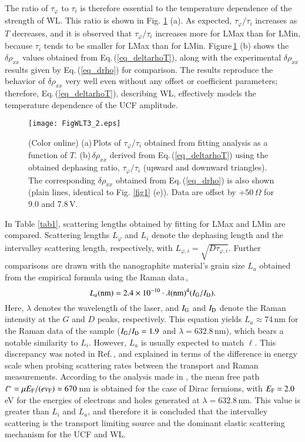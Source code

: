 \documentclass[final,5p,times,twocolumn]{elsarticle}
\begin{document}
The ratio of $\tau_\varphi$ to $\tau_i$ is therefore essential to the temperature dependence of the strength of WL. 
This ratio is shown in Fig. \ref{figWLT3} (a). 
As expected, $\tau_\varphi/\tau_i$ increases as $T$ decreases, and it is 
observed that $\tau_\varphi/\tau_i$ increases more for LMax than for LMin, because $\tau_i$ tends to be smaller for LMax than for LMin.
Figure\,\ref{figWLT3} (b) shows the $\delta\rho_{xx}$ values obtained from Eq.\,(\ref{eq_deltarhoT}), along with the experimental $\delta\rho_{xx}$ results given by Eq.\,(\ref{eq_drho}) for comparison.
The results reproduce the behavior of $\delta\rho_{xx}$ very well even without any offset or coefficient parameters; therefore, Eq.\,(\ref{eq_deltarhoT}), describing WL, effectively models the temperature dependence of the UCF amplitude.

\begin{figure}  [t]
\texttt{[image: FigWLT3\_2.eps]}
\caption{\label{figWLT3}(Color online) (a)\,Plots of  $\tau_\varphi/\tau_i$ obtained from fitting analysis as a function of $T$. (b)\,$\delta\rho_{xx}$ derived from Eq.\,(\ref{eq_deltarhoT}) using the obtained dephasing ratio, $\tau_\varphi/\tau_i$ (upward and downward triangles). The corresponding $\delta\rho_{xx}$ obtained from Eq.\,(\ref{eq_drho}) is also shown (plain lines, identical to Fig. \ref{fig1} (e)). Data are offset by $+50$\,$\Omega$ for 9.0 and 7.8\,V.}
\end{figure}


In Table \ref{tab1}, scattering lengths obtained by fitting for LMax and LMin are compared. 
Scattering lengths $L_\varphi$ and $L_i$ denote the dephasing length and the intervalley scattering length, respectively, with $L_{\varphi,i} = \sqrt{D\tau_{\varphi,i}}$.
Further comparisons are drawn with the nanographite material's grain size $L_a$ obtained from the 
empirical formula using the Raman data\,\cite{Cancado},
\begin{equation}
L_a({\rm nm}) = 2.4 \times 10^{-10}\cdot \lambda({\rm nm})^4(I_{\rm G}/I_{\rm D}).
\end{equation}
Here, $\lambda$ denotes the wavelength of the laser, and $I_{\rm G}$ and $I_{\rm D}$ denote the Raman intensity at the $G$ and $D$ peaks, respectively.
This equation yields $L_a \approx 74$\,nm for the Raman data of the sample ($I_{\rm G}/I_{\rm D} = 1.9$ and $\lambda = 632.8$\,nm), which bears a notable similarity to $L_i$.
However, $L_a$ is usually expected to match $\ell$.
This discrepancy was noted in Ref.\,\cite{Ni}, and explained in terms of the difference in energy scale when probing scattering rates between the transport and Raman measurements.
According to the analysis made in \cite{Ni}, the mean free path $\ell^\ast = \mu E_{\rm F}/(ev_{\rm F}) \approx 670$\,nm is obtained for the case of Dirac fermions, with $E_{\rm F} = 2.0$\,eV for the energies of electrons and holes generated at $\lambda = 632.8$\,nm.
This value is greater than $L_i$ and $L_a$, and therefore it is concluded that the intervalley scattering is  the transport limiting source and the dominant elastic scattering mechanism for the UCF and WL.
  
\end{document}
